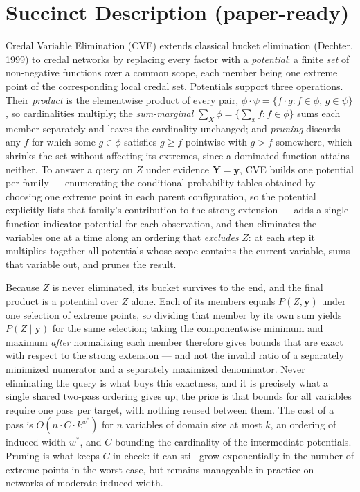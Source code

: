 \documentclass[11pt]{article}
\theoremstyle{definition}
\newcommand{\bY}{\mathbf{Y}}
\newcommand{\by}{\mathbf{y}}
\begin{document}
\section{Succinct Description (paper-ready)}
\label{sec:succinct}

Credal Variable Elimination (CVE) extends classical bucket elimination
(Dechter, 1999) to credal networks by replacing every factor with a
\emph{potential}: a finite \emph{set} of non-negative functions over a common
scope, each member being one extreme point of the corresponding local credal set.
Potentials support three operations. Their \emph{product} is the elementwise
product of every pair, $\phi \cdot \psi = \{f \cdot g : f \in \phi,\,
g \in \psi\}$, so cardinalities multiply; the \emph{sum-marginal}
$\sum_X \phi = \{\sum_x f : f \in \phi\}$ sums each member separately and leaves
the cardinality unchanged; and \emph{pruning} discards any $f$ for which some
$g \in \phi$ satisfies $g \geq f$ pointwise with $g > f$ somewhere, which shrinks
the set without affecting its extremes, since a dominated function attains
neither. To answer a query on $Z$ under evidence $\bY = \by$, CVE builds one
potential per family --- enumerating the conditional probability tables obtained
by choosing one extreme point in each parent configuration, so the potential
explicitly lists that family's contribution to the strong extension --- adds a
single-function indicator potential for each observation, and then eliminates the
variables one at a time along an ordering that \emph{excludes} $Z$: at each step
it multiplies together all potentials whose scope contains the current variable,
sums that variable out, and prunes the result.

Because $Z$ is never eliminated, its bucket survives to the end, and the final
product is a potential over $Z$ alone. Each of its members equals
$P(Z, \by)$ under one selection of extreme points, so dividing that member by its
own sum yields $P(Z \mid \by)$ for the same selection; taking the componentwise
minimum and maximum \emph{after} normalizing each member therefore gives bounds
that are exact with respect to the strong extension --- and not the invalid ratio
of a separately minimized numerator and a separately maximized denominator.
Never eliminating the query is what buys this exactness, and it is precisely what
a single shared two-pass ordering gives up; the price is that bounds for all
variables require one pass per target, with nothing reused between them. The cost
of a pass is $O(n \cdot C \cdot k^{w^*})$ for $n$ variables of domain size at
most $k$, an ordering of induced width $w^*$, and $C$ bounding the cardinality of
the intermediate potentials. Pruning is what keeps $C$ in check: it can still
grow exponentially in the number of extreme points in the worst case, but remains
manageable in practice on networks of moderate induced width.
\end{document}
